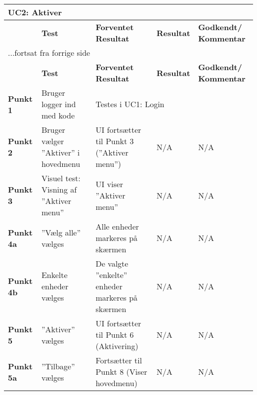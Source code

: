 
\begin{center}
\begin{longtable}{|p{}|p{}|p{3cm}|p{3cm}|p{3cm}|} %
\hline
\multicolumn{5}{|l|}{\textbf{UC2: Aktiver}} \\ \hline
\multicolumn{1}{|c|}{} &
\textbf{Test} &
\textbf{Forventet \newline Resultat} &
\textbf{Resultat} &
\textbf{Godkendt/ \newline Kommentar} \\ \hline 
\endfirsthead

\multicolumn{5}{l}{...fortsat fra forrige side} \\ \hline 
\multicolumn{1}{|c|}{} &
\textbf{Test} &
\textbf{Forventet \newline Resultat} &
\textbf{Resultat} &
\textbf{Godkendt/ \newline Kommentar} \\ \hline 
\endhead


\textbf{Punkt 1}		&Bruger logger ind med kode	
					&\multicolumn{3}{l|}{Testes i UC1: Login} \\\hline
		
\textbf{Punkt 2}		&Bruger vælger ''Aktiver'' i hovedmenu																
					&UI fortsætter til Punkt 3 (''Aktiver menu'')
					&N/A 
					&N/A \\\hline
					
\textbf{Punkt 3}		&Visuel test: Visning af ''Aktiver menu''																
					&UI viser ''Aktiver menu''
					&N/A 
					&N/A \\\hline
		
\textbf{Punkt 4a}	&''Vælg alle'' vælges		
					&Alle enheder markeres på skærmen		 	
					&N/A 
					&N/A \\\hline

\textbf{Punkt 4b}	&Enkelte enheder vælges
					&De valgte ''enkelte'' enheder markeres på skærmen
					&N/A 
					&N/A \\\hline

\textbf{Punkt 5}		&''Aktiver'' vælges			
					&UI fortsætter til Punkt 6 (Aktivering)
					&N/A 
					&N/A \\\hline
					
\textbf{Punkt 5a}	&''Tilbage'' vælges			
					&Fortsætter til Punkt 8 (Viser hovedmenu)
					&N/A 
					&N/A \\\hline


\end{longtable}
\end{center}
